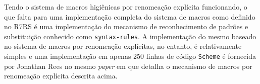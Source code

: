 Tendo o sistema de macros higiênicas por renomeação explícita funcionando, o que falta
para uma implementação completa do sistema de macros como definido no \acs{R7RS}
é uma implementação do mecanismo de reconhecimento de padrões e substituição
conhecido como \texttt{syntax-rules}. A implementação do mesmo baseado no
sistema de macros por renomeação explícitas, no entanto, é relativamente simples
e uma implementação em apenas 250 linhas de código \texttt{Scheme} é fornecida
por Jonathan Rees no mesmo \textit{paper} em que detalha o mecanismo de macros
por renomeação explícita descrita acima\cite{scheme-of-things}.
